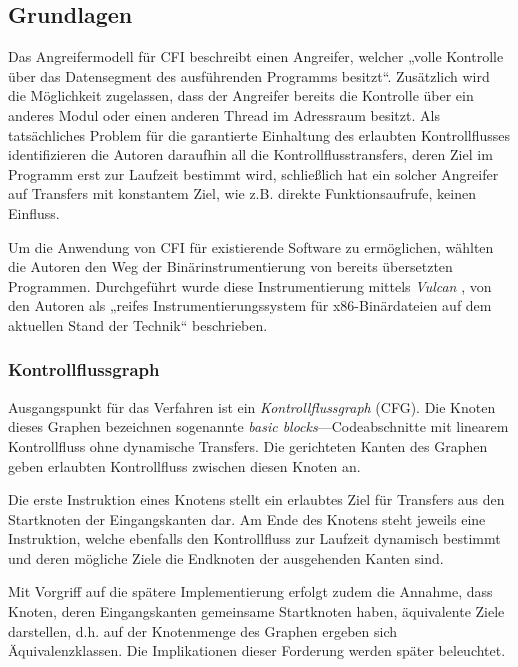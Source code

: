 \documentclass[11pt]{article}
\begin{document}
\subsection{Grundlagen}

Das Angreifermodell für CFI beschreibt einen Angreifer, welcher „volle
Kontrolle über das Datensegment des ausführenden Programms besitzt“. Zusätzlich
wird die Möglichkeit zugelassen, dass der Angreifer bereits die Kontrolle über
ein anderes Modul oder einen anderen Thread im Adressraum besitzt. Als
tatsächliches Problem für die garantierte Einhaltung des erlaubten
Kontrollflusses identifizieren die Autoren daraufhin all die
Kontrollflusstransfers, deren Ziel im Programm erst zur Laufzeit bestimmt wird,
schließlich hat ein solcher Angreifer auf Transfers mit konstantem Ziel, wie
z.B. direkte Funktionsaufrufe, keinen Einfluss.

\label{intro-impl}

Um die Anwendung von CFI für existierende Software zu ermöglichen, wählten die
Autoren den Weg der Binärinstrumentierung von bereits übersetzten Programmen.
Durchgeführt wurde diese Instrumentierung mittels \emph{Vulcan}
\cite{edwards-vulcan}, von den Autoren als „reifes Instrumentierungssystem für
x86-Binärdateien auf dem aktuellen Stand der Technik“ beschrieben.

\subsubsection{Kontrollflussgraph}
\label{sec:cfg}

Ausgangspunkt für das Verfahren ist ein \emph{Kontrollflussgraph} (CFG). Die
Knoten dieses Graphen bezeichnen sogenannte \emph{basic blocks}—Codeabschnitte
mit linearem Kontrollfluss ohne dynamische Transfers. Die gerichteten Kanten
des Graphen geben erlaubten Kontrollfluss zwischen diesen Knoten an.

Die erste Instruktion eines Knotens stellt ein erlaubtes Ziel für Transfers aus
den Startknoten der Eingangskanten dar. Am Ende des Knotens steht jeweils eine
Instruktion, welche ebenfalls den Kontrollfluss zur Laufzeit dynamisch bestimmt
und deren mögliche Ziele die Endknoten der ausgehenden Kanten sind.

Mit Vorgriff auf die spätere Implementierung erfolgt zudem die Annahme, dass
Knoten, deren Eingangskanten gemeinsame Startknoten haben, äquivalente Ziele
darstellen, d.h. auf der Knotenmenge des Graphen ergeben sich
Äquivalenzklassen. Die Implikationen dieser Forderung werden später beleuchtet.
\end{document}
